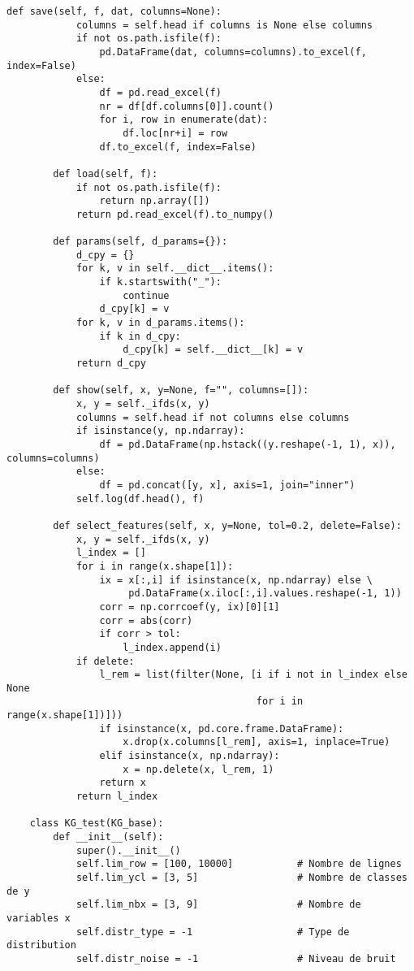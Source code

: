 \documentclass[a4paper,11pt]{article}
\begin{document}
\begin{lstlisting}[caption={Exemple de classe Python}, label={lst:python_code}]
        def save(self, f, dat, columns=None):
            columns = self.head if columns is None else columns
            if not os.path.isfile(f):
                pd.DataFrame(dat, columns=columns).to_excel(f, index=False)
            else:
                df = pd.read_excel(f)
                nr = df[df.columns[0]].count()
                for i, row in enumerate(dat):
                    df.loc[nr+i] = row
                df.to_excel(f, index=False)
    
        def load(self, f):
            if not os.path.isfile(f):
                return np.array([])
            return pd.read_excel(f).to_numpy()
    
        def params(self, d_params={}):
            d_cpy = {}
            for k, v in self.__dict__.items():
                if k.startswith("_"):
                    continue
                d_cpy[k] = v
            for k, v in d_params.items():
                if k in d_cpy:
                    d_cpy[k] = self.__dict__[k] = v
            return d_cpy
    
        def show(self, x, y=None, f="", columns=[]):
            x, y = self._ifds(x, y)
            columns = self.head if not columns else columns
            if isinstance(y, np.ndarray):
                df = pd.DataFrame(np.hstack((y.reshape(-1, 1), x)), columns=columns)
            else:
                df = pd.concat([y, x], axis=1, join="inner")
            self.log(df.head(), f)
    
        def select_features(self, x, y=None, tol=0.2, delete=False):
            x, y = self._ifds(x, y)
            l_index = []
            for i in range(x.shape[1]):
                ix = x[:,i] if isinstance(x, np.ndarray) else \
                     pd.DataFrame(x.iloc[:,i].values.reshape(-1, 1))
                corr = np.corrcoef(y, ix)[0][1]
                corr = abs(corr)
                if corr > tol:
                    l_index.append(i)
            if delete:
                l_rem = list(filter(None, [i if i not in l_index else None 
                                           for i in range(x.shape[1])]))
                if isinstance(x, pd.core.frame.DataFrame):
                    x.drop(x.columns[l_rem], axis=1, inplace=True)
                elif isinstance(x, np.ndarray):
                    x = np.delete(x, l_rem, 1)
                return x
            return l_index
    
    class KG_test(KG_base):
        def __init__(self):
            super().__init__()
            self.lim_row = [100, 10000]           # Nombre de lignes
            self.lim_ycl = [3, 5]                 # Nombre de classes de y
            self.lim_nbx = [3, 9]                 # Nombre de variables x
            self.distr_type = -1                  # Type de distribution
            self.distr_noise = -1                 # Niveau de bruit
    

\end{lstlisting}
\end{document}
